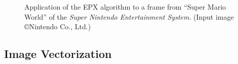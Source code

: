 \documentclass[]{usiinfbachelorproject}
\begin{document}
\begin{figure}[ht!]
	\centering
	\caption{Application of the EPX algorithm to a frame from ``Super Mario World'' of the \emph{Super Nintendo Entertainment System}. (Input image \copyright Nintendo Co., Ltd.)}
	\label{fig:snes}
\end{figure}


\subsection{Image Vectorization} \label{sec:imagevect}
\end{document}
